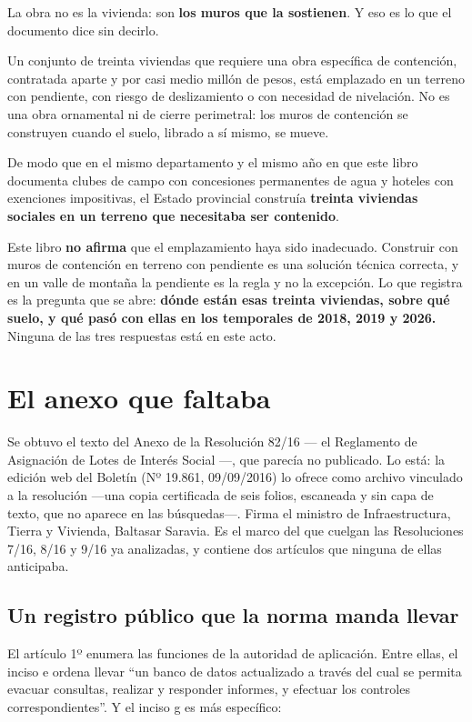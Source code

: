 \begin{cautela}
La obra no es la vivienda: son \textbf{los muros que la sostienen}. Y eso es lo que el documento dice sin decirlo.

Un conjunto de treinta viviendas que requiere una obra específica de contención, contratada aparte y por casi medio millón de pesos, está emplazado en un terreno con pendiente, con riesgo de deslizamiento o con necesidad de nivelación. No es una obra ornamental ni de cierre perimetral: los muros de contención se construyen cuando el suelo, librado a sí mismo, se mueve.

De modo que en el mismo departamento y el mismo año en que este libro documenta clubes de campo con concesiones permanentes de agua y hoteles con exenciones impositivas, el Estado provincial construía \textbf{treinta viviendas sociales en un terreno que necesitaba ser contenido}.

Este libro \textbf{no afirma} que el emplazamiento haya sido inadecuado. Construir con muros de contención en terreno con pendiente es una solución técnica correcta, y en un valle de montaña la pendiente es la regla y no la excepción. Lo que registra es la pregunta que se abre: \textbf{dónde están esas treinta viviendas, sobre qué suelo, y qué pasó con ellas en los temporales de 2018, 2019 y 2026.} Ninguna de las tres respuestas está en este acto.
\end{cautela}


\section{El anexo que faltaba}

Se obtuvo el texto del Anexo de la Resolución 82/16 --- el Reglamento de Asignación de Lotes de Interés Social ---, que parecía no publicado. Lo está: la edición web del Boletín (Nº 19.861, 09/09/2016) lo ofrece como archivo vinculado a la resolución ---una copia certificada de seis folios, escaneada y sin capa de texto, que no aparece en las búsquedas---. Firma el ministro de Infraestructura, Tierra y Vivienda, Baltasar Saravia. Es el marco del que cuelgan las Resoluciones 7/16, 8/16 y 9/16 ya analizadas, y contiene dos artículos que ninguna de ellas anticipaba.

\subsection*{Un registro público que la norma manda llevar}

El artículo 1º enumera las funciones de la autoridad de aplicación. Entre ellas, el inciso e ordena llevar ``un banco de datos actualizado a través del cual se permita evacuar consultas, realizar y responder informes, y efectuar los controles correspondientes''. Y el inciso g es más específico:

